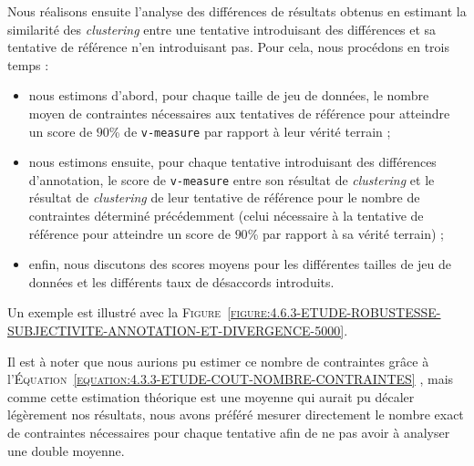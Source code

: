 			Nous réalisons ensuite l'analyse des différences de résultats obtenus en estimant la similarité des \textit{clustering} entre une tentative introduisant des différences et sa tentative de référence n'en introduisant pas.
			Pour cela, nous procédons en trois temps :
			\begin{itemize}
				\item nous estimons d'abord, pour chaque taille de jeu de données, le nombre moyen de contraintes nécessaires aux tentatives de référence pour atteindre un score de $90$\% de \texttt{v-measure} par rapport à leur vérité terrain ;
				\item nous estimons ensuite, pour chaque tentative introduisant des différences d'annotation, le score de \texttt{v-measure} entre son résultat de \textit{clustering} et le résultat de \textit{clustering} de leur tentative de référence pour le nombre de contraintes déterminé précédemment (celui nécessaire à la tentative de référence pour atteindre un score de $90$\% par rapport à sa vérité terrain) ;
				\item enfin, nous discutons des scores moyens pour les différentes tailles de jeu de données et les différents taux de désaccords introduits.
			\end{itemize}
			Un exemple est illustré avec la \textsc{Figure~\ref{figure:4.6.3-ETUDE-ROBUSTESSE-SUBJECTIVITE-ANNOTATION-ET-DIVERGENCE-5000}}.
			
			\setcounter{localCounterOfFootnoteValue}{\value{footnote}}
			\begin{leftBarAuthorOpinion}
				Il est à noter que nous aurions pu estimer ce nombre de contraintes grâce à l'\textsc{Équation~\ref{equation:4.3.3-ETUDE-COUT-NOMBRE-CONTRAINTES}} \footnotemark, mais comme cette estimation théorique est une moyenne qui aurait pu décaler légèrement nos résultats, nous avons préféré mesurer directement le nombre exact de contraintes nécessaires pour chaque tentative afin de ne pas avoir à analyser une double moyenne.
			\end{leftBarAuthorOpinion}
			
